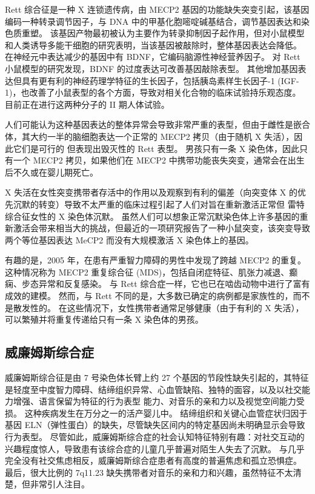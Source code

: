 Rett 综合征是一种 X 连锁遗传病，由 MECP2 基因的功能缺失突变引起，该基因编码一种转录调节因子，与 DNA 中的甲基化胞嘧啶碱基结合，调节基因表达和染色质重塑。 该基因产物最初被认为主要作为转录抑制因子起作用，但对小鼠模型和人类诱导多能干细胞的研究表明，当该基因被敲除时，整体基因表达会降低。 在神经元中表达减少的基因中有 BDNF，它编码脑源性神经营养因子。 对 Rett 小鼠模型的研究发现，BDNF 的过度表达可改善基因敲除表型。 其他增加基因表达但具有更有利的神经药理学特征的生长因子，包括胰岛素样生长因子-1 (IGF-1)，也改善了小鼠表型的各个方面，导致对相关化合物的临床试验持乐观态度。 目前正在进行这两种分子的 II 期人体试验。

人们可能认为这种基因表达的整体异常会导致非常严重的表型，但由于雌性是嵌合体，其大约一半的脑细胞表达一个正常的 MECP2 拷贝（由于随机 X 失活），因此它们是可行的 但表现出毁灭性的 Rett 表型。 男孩只有一条 X 染色体，因此只有一个 MECP2 拷贝，如果他们在 MECP2 中携带功能丧失突变，通常会在出生后不久或在婴儿期死亡。

X 失活在女性突变携带者存活中的作用以及观察到有利的偏差（向突变体 X 的优先沉默的转变）导致不太严重的临床过程引起了人们对旨在重新激活正常但 雷特综合征女性的 X 染色体沉默。 虽然人们可以想象正常沉默染色体上许多基因的重新激活会带来相当大的挑战，但最近的一项研究报告了一种小鼠突变，该突变导致两个等位基因表达 MeCP2 而没有大规模激活 X 染色体上的基因。

有趣的是，2005 年，在患有严重智力障碍的男性中发现了跨越 MECP2 的重复。 这种情况称为 MECP2 重复综合征 (MDS)，包括自闭症特征、肌张力减退、癫痫、步态异常和反复感染。 与 Rett 综合症一样，它也已在啮齿动物中进行了富有成效的建模。 然而，与 Rett 不同的是，大多数已确定的病例都是家族性的，而不是散发性的。 在这些情况下，女性携带者通常足够健康（由于有利的 X 失活），可以繁殖并将重复传递给只有一条 X 染色体的男孩。

\subsection{威廉姆斯综合症}
威廉姆斯综合征是由 7 号染色体长臂上约 27 个基因的节段性缺失引起的，其特征是轻度至中度智力障碍、结缔组织异常、心血管缺陷、独特的面容，以及以社交能力增强、语言保留为特征的行为表型 能力、对音乐的亲和力以及视觉空间能力受损。 这种疾病发生在万分之一的活产婴儿中。 结缔组织和关键心血管症状归因于基因 ELN（弹性蛋白）的缺失，尽管缺失区间内的特定基因尚未明确显示会导致行为表型。 尽管如此，威廉姆斯综合症的社会认知特征特别有趣：对社交互动的兴趣程度惊人，导致患有该综合症的儿童几乎普遍对陌生人失去了沉默。 与几乎完全没有社交焦虑相反，威廉姆斯综合症患者有高度的普遍焦虑和孤立恐惧症。 最后，很大比例的 7q11.23 缺失携带者对音乐的亲和力和兴趣，虽然特征不太清楚，但非常引人注目。

